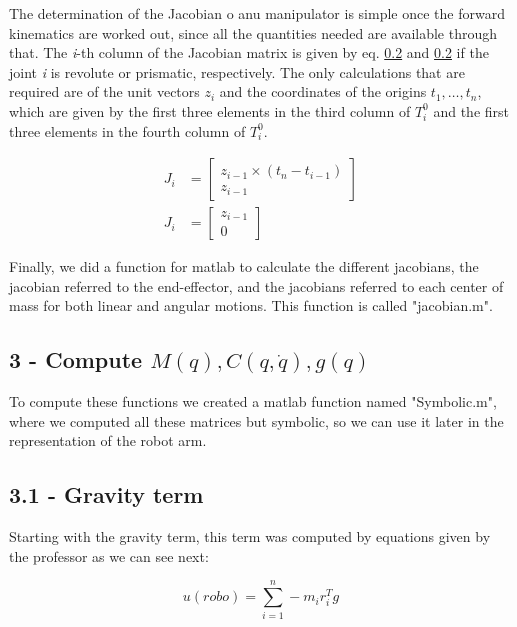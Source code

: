 The determination of the Jacobian o anu manipulator is simple once the forward kinematics are worked out, since all the quantities needed are available through that. The \textit{i}-th column of the Jacobian matrix is given by eq. \ref{} and \ref{} if the joint \textit{i} is revolute or prismatic, respectively. The only calculations that are required are of the unit vectors $z_i$ and the coordinates of the origins $t_1, \hdots, t_n$, which are given by the first three elements in the third column of $T_i^0$ and the first three elements in the fourth column of $T_i^0$.

\begin{subequations}
    \begin{align}
        J_i &=
	\begin{bmatrix}
		z_{i-1} \times (t_n - t_{i-1}) \\
		z_{i-1}
	\end{bmatrix} \\
        J_i &=
	\begin{bmatrix}
		z_{i-1} \\
		0
	\end{bmatrix}
    \end{align}
\end{subequations}

Finally, we did a function for matlab to calculate the different jacobians, the jacobian referred to the end-effector, and the jacobians referred to each center of mass for both linear and angular motions. This function is called "jacobian.m".

\subsection{3 - Compute $M(q), C(q,\dot{q}), g(q)$}

To compute these functions we created a matlab function named "Symbolic.m", where we computed all these matrices but symbolic, so we can use it later in the representation of the robot arm.

\subsection{3.1 - Gravity term}

Starting with the gravity term, this term was computed by equations given by the professor as we can see next:

\begin{equation}
    u(robo) =  \sum_{i=1}^{n} -m_ir_i^Tg  
\end{equation}

